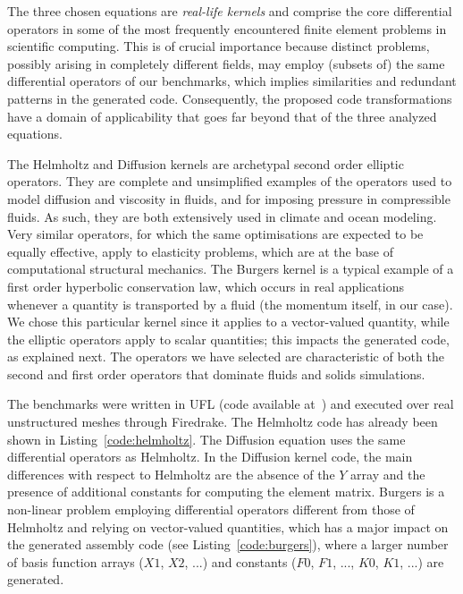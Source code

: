 The three chosen equations are \emph{real-life kernels} and comprise the core differential operators in some of the most frequently encountered finite element problems in scientific computing. This is of crucial importance because distinct problems, possibly arising in completely different fields, may employ (subsets of) the same differential operators of our benchmarks, which implies similarities and redundant patterns in the generated code. Consequently, the proposed code transformations have a domain of applicability that goes far beyond that of the three analyzed equations.

The Helmholtz and Diffusion kernels are archetypal second order elliptic operators. They are complete and unsimplified examples of the operators used to model diffusion and viscosity in fluids, and for imposing pressure in compressible fluids. As such, they are both extensively used in climate and ocean modeling. Very similar operators, for which the same optimisations are expected to be equally effective, apply to elasticity problems, which are at the base of computational structural mechanics. The Burgers kernel is a typical example of a first order hyperbolic conservation law, which occurs in real applications whenever a quantity is transported by a fluid (the momentum itself, in our case). We chose this particular kernel since it applies to a vector-valued quantity, while the elliptic operators apply to scalar quantities; this impacts the generated code, as explained next. The operators we have selected are characteristic of both the second and first order operators that dominate fluids and solids simulations.

The benchmarks were written in UFL (code available at~\cite{ufl-code}) and executed over real unstructured meshes through Firedrake. The Helmholtz code has already been shown in Listing~\ref{code:helmholtz}. The Diffusion equation uses the same differential operators as Helmholtz. In the Diffusion kernel code, the main differences with respect to Helmholtz are the absence of the $Y$ array and the presence of additional constants for computing the element matrix. Burgers is a non-linear problem employing differential operators different from those of Helmholtz and relying on vector-valued quantities, which has a major impact on the generated assembly code (see Listing~\ref{code:burgers}), where a larger number of basis function arrays ($X1$, $X2$, ...) and constants ($F0$, $F1$, ..., $K0$, $K1$,
...) are generated. 

